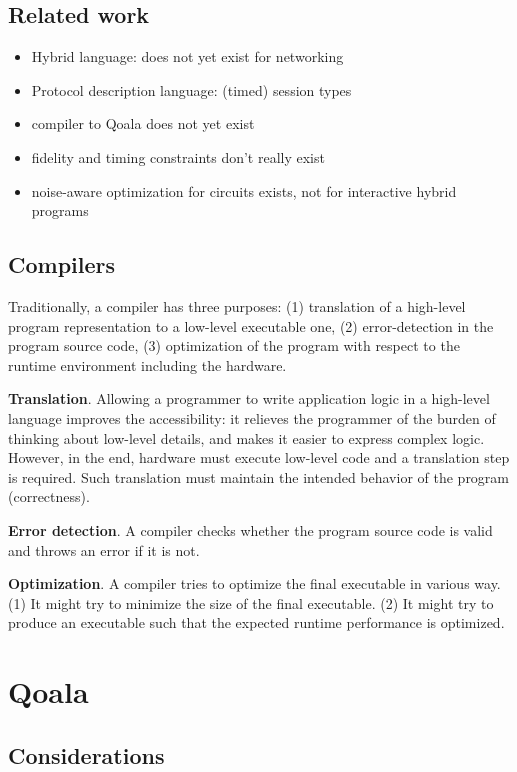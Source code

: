 \subsection{Related work}
\begin{itemize}
    \item Hybrid language: does not yet exist for networking
    \item Protocol description language: (timed) session types
    \item compiler to Qoala does not yet exist
    \item fidelity and timing constraints don't really exist
    \item noise-aware optimization for circuits exists, not for interactive hybrid programs
\end{itemize}


\subsection{Compilers}
Traditionally, a compiler has three purposes:
(1) translation of a high-level program representation to a low-level executable one,
(2) error-detection in the program source code,
(3) optimization of the program with respect to the runtime environment including the hardware.

\textbf{Translation}. Allowing a programmer to write application logic in a high-level language improves the accessibility: it relieves the programmer of the burden of thinking about low-level details, and makes it easier to express complex logic. However, in the end, hardware must execute low-level code and a translation step is required. Such translation must maintain the intended behavior of the program (correctness).

\textbf{Error detection}. A compiler checks whether the program source code is valid and throws an error if it is not.

\textbf{Optimization}. A compiler tries to optimize the final executable in various way. (1) It might try to minimize the size of the final executable. (2) It might try to produce an executable such that the expected runtime performance is optimized.

\section{Qoala}

\subsection{Considerations}


